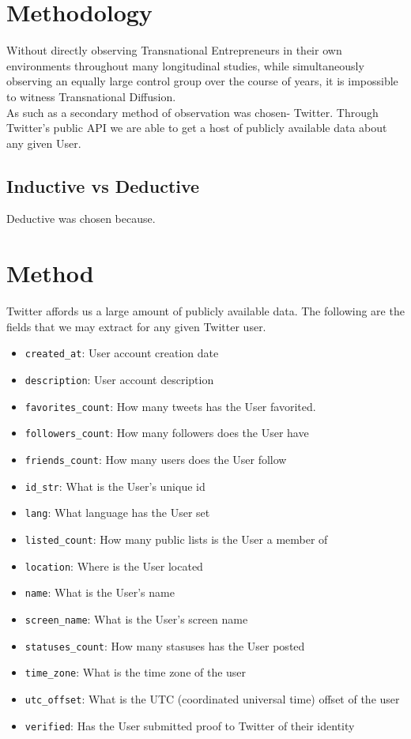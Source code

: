 \section{Methodology}
Without directly observing Transnational Entrepreneurs in their own environments throughout many longitudinal studies, while simultaneously observing an equally large control group over the course of years, it is impossible to witness Transnational Diffusion.
\\
As such as a secondary method of observation was chosen- Twitter. Through Twitter's public API we are able to get a host of publicly available data about any given User.

\subsection{Inductive vs Deductive}
Deductive was chosen because.


\section{Method}

Twitter affords us a large amount of publicly available data. The following are the fields that we may extract for any given Twitter user.

\begin{itemize}
\item \verb|created_at|: User account creation date
\item \verb|description|: User account description
\item \verb|favorites_count|: How many tweets has the User favorited.
\item \verb|followers_count|: How many followers does the User have
\item \verb|friends_count|: How many users does the User follow
\item \verb|id_str|: What is the User's unique id
\item \verb|lang|: What language has the User set
\item \verb|listed_count|: How many public lists is the User a member of
\item \verb|location|: Where is the User located
\item \verb|name|: What is the User's name
\item \verb|screen_name|: What is the User's screen name
\item \verb|statuses_count|: How many stasuses has the User posted
\item \verb|time_zone|: What is the time zone of the user
\item \verb|utc_offset|: What is the UTC (coordinated universal time) offset of the user
\item \verb|verified|: Has the User submitted proof to Twitter of their identity
\end{itemize}

